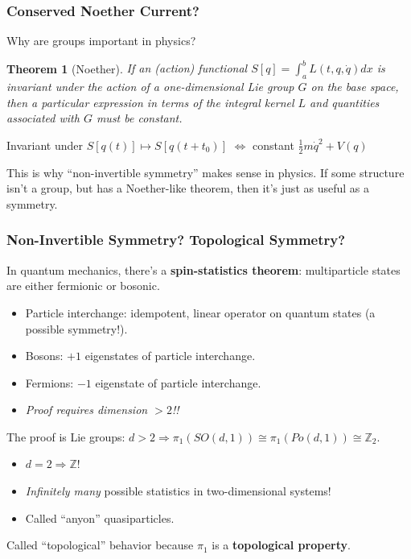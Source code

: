 \documentclass[10pt]{beamer}
\newtheorem{thm}{Theorem}
\begin{document}
\begin{frame}
  \frametitle{Conserved Noether Current?}
  Why are groups important in physics?
  \begin{thm}[Noether]
    If an (action) functional $S[q] = \int_{a}^{b}L(t, q, \dot{q})dx$ is invariant under the action of
    a one-dimensional Lie group $G$ on the base space,
    then a particular expression in terms of the integral kernel $L$ and quantities associated with $G$ must be constant.
  \end{thm}

  Invariant under $S[q(t)] \mapsto S[q(t + t_{0})]$ $\Leftrightarrow$ constant $\frac{1}{2}m\dot{q}^{2} + V(q)$

  This is why ``non-invertible symmetry'' makes sense in physics.
  If some structure isn't a group, but has a Noether-like theorem, then it's just as useful as a symmetry.
\end{frame}


\begin{frame}
  \frametitle{Non-Invertible Symmetry? Topological Symmetry?}
  In quantum mechanics, there's a \textbf{spin-statistics theorem}: multiparticle states are either fermionic or bosonic.
  \begin{itemize}
  \item Particle interchange: idempotent, linear operator on quantum states (a possible symmetry!).
  \item Bosons: $+1$ eigenstates of particle interchange.
  \item Fermions: $-1$ eigenstate of particle interchange.
  \item \textit{Proof requires dimension $> 2$!!}
  \end{itemize}

  The proof is Lie groups: $d > 2 \Rightarrow \pi_{1}(SO(d, 1)) \cong \pi_{1}(Po(d, 1)) \cong \mathbb{Z}_{2}$.
  \newline
  \begin{itemize}
  \item $d = 2 \Rightarrow \mathbb{Z}!$
  \item \textit{Infinitely many} possible statistics in two-dimensional systems!
  \item Called ``anyon'' quasiparticles.
  \end{itemize}

  Called ``topological'' behavior because $\pi_{1}$ is a \textbf{topological property}.
\end{frame}
\end{document}
